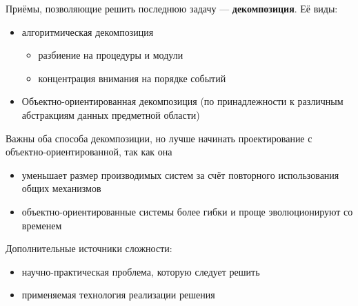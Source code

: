 Приёмы, позволяющие решить последнюю задачу --- \textbf{декомпозиция}. Её виды:
\begin{itemize}
  \item алгоритмическая декомпозиция \begin{itemize}
    \item разбиение на процедуры и модули
    \item концентрация внимания на порядке событий
  \end{itemize}
  \item Объектно-ориентированная декомпозиция (по принадлежности к различным абстракциям данных предметной области)
\end{itemize}

Важны оба способа декомпозиции, но лучше начинать проектирование с объектно-ориентированной, так как она
\begin{itemize}
  \item уменьшает размер производимых систем за счёт повторного использования общих механизмов
  \item объектно-ориентированные системы более гибки и проще эволюционируют со временем
\end{itemize}

Дополнительные источники сложности:
\begin{itemize}
  \item научно-практическая проблема, которую следует решить
  \item применяемая технология реализации решения
\end{itemize}